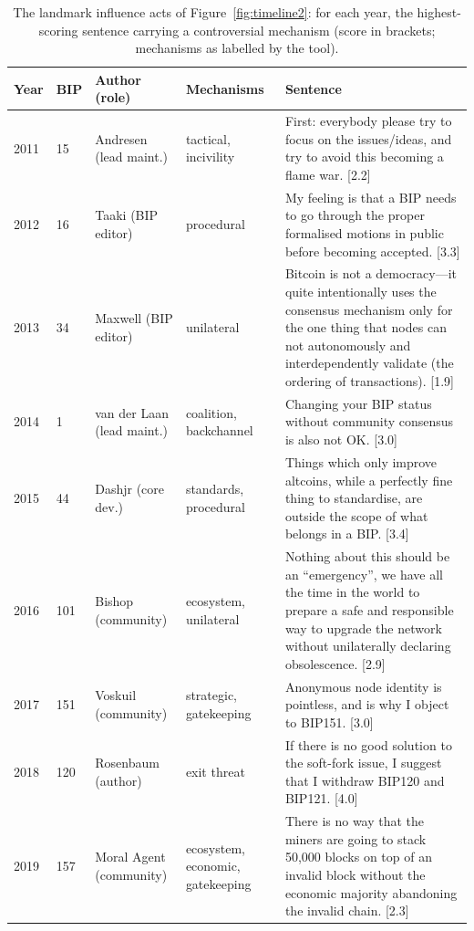 \documentclass[sigconf,screen]{acmart}
\begin{document}
\begin{table}[t]
\caption{The landmark influence acts of Figure~\ref{fig:timeline2}: for each year, the highest-scoring sentence carrying a controversial mechanism (score in brackets; mechanisms as labelled by the tool).}
\label{tab:landmarks}
\footnotesize
\begin{tabular}{p{}p{}p{}p{}p{}}
\toprule
Year & BIP & Author (role) & Mechanisms & Sentence \\
\midrule
2011 & 15 & Andresen (lead maint.) & tactical, incivility & First: everybody please try to focus on the issues/ideas, and try to avoid this becoming a flame war. [2.2] \\
2012 & 16 & Taaki (BIP editor) & procedural & My feeling is that a BIP needs to go through the proper formalised motions in public before becoming accepted. [3.3] \\
2013 & 34 & Maxwell (BIP editor) & unilateral & Bitcoin is not a democracy---it quite intentionally uses the consensus mechanism only for the one thing that nodes can not autonomously and interdependently validate (the ordering of transactions). [1.9] \\
2014 & 1 & van der Laan (lead maint.) & coalition, backchannel & Changing your BIP status without community consensus is also not OK. [3.0] \\
2015 & 44 & Dashjr (core dev.) & standards, procedural & Things which only improve altcoins, while a perfectly fine thing to standardise, are outside the scope of what belongs in a BIP. [3.4] \\
2016 & 101 & Bishop (community) & ecosystem, unilateral & Nothing about this should be an ``emergency'', we have all the time in the world to prepare a safe and responsible way to upgrade the network without unilaterally declaring obsolescence. [2.9] \\
2017 & 151 & Voskuil (community) & strategic, gatekeeping & Anonymous node identity is pointless, and is why I object to BIP151. [3.0] \\
2018 & 120 & Rosenbaum (author) & exit threat & If there is no good solution to the soft-fork issue, I suggest that I withdraw BIP120 and BIP121. [4.0] \\
2019 & 157 & Moral Agent (community) & ecosystem, economic, gatekeeping & There is no way that the miners are going to stack 50,000 blocks on top of an invalid block without the economic majority abandoning the invalid chain. [2.3] \\

\end{tabular}
\end{table}
\end{document}
